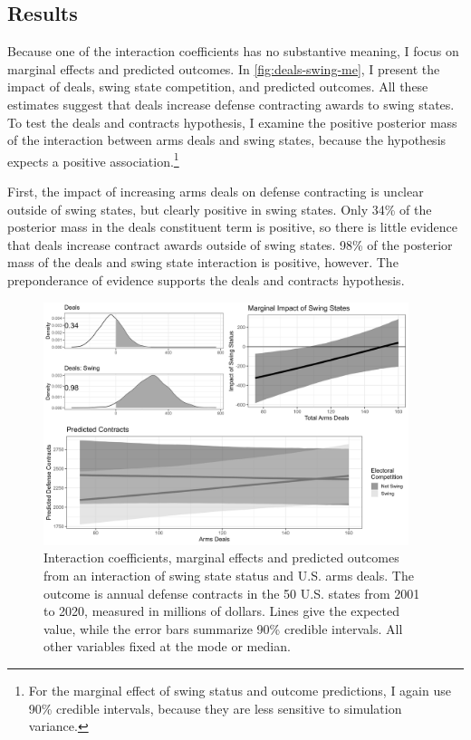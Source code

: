 \documentclass[12pt]{article}
\begin{document}
\subsection{Results}


Because one of the interaction coefficients has no substantive meaning, I focus on marginal effects and predicted outcomes.
In \autoref{fig:deals-swing-me}, I present the impact of deals, swing state competition, and predicted outcomes.
All these estimates suggest that deals increase defense contracting awards to swing states. 
To test the deals and contracts hypothesis, I examine the positive posterior mass of the interaction between arms deals and swing states, because the hypothesis expects a positive association.\footnote{For the marginal effect of swing status and outcome predictions, I again use 90\% credible intervals, because they are less sensitive to simulation variance.}


First, the impact of increasing arms deals on defense contracting is unclear outside of swing states, but clearly positive in swing states. 
Only 34\% of the posterior mass in the deals constituent term is positive, so there is little evidence that deals increase contract awards outside of swing states. 
98\% of the posterior mass of the deals and swing state interaction is positive, however. 
The preponderance of evidence supports the deals and contracts hypothesis.


\begin{figure}[htpb]
	\centering
		\includegraphics[width=0.95\textwidth]{../figures/deals-swing-me.png}
	\caption{Interaction coefficients, marginal effects and predicted outcomes from an interaction of swing state status and U.S. arms deals. The outcome is annual defense contracts in the 50 U.S. states from 2001 to 2020, measured in millions of dollars. Lines give the expected value, while the error bars summarize 90\% credible intervals. All other variables fixed at the mode or median.}
	\label{fig:deals-swing-me}
\end{figure}
\end{document}
